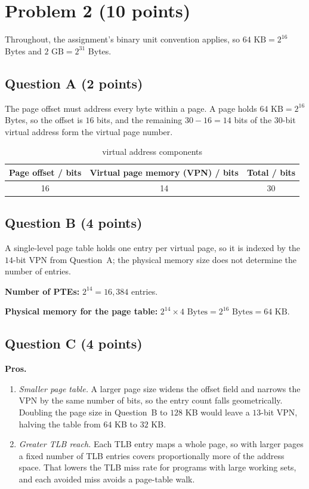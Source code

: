 \section*{Problem 2 (10 points)}

Throughout, the assignment's binary unit convention applies, so
$64\text{ KB} = 2^{16}$ Bytes and $2\text{ GB} = 2^{31}$ Bytes.

\subsection*{Question A (2 points)}

The page offset must address every byte within a page. A page holds
$64\text{ KB} = 2^{16}$ Bytes, so the offset is $16$ bits, and the remaining
$30 - 16 = 14$ bits of the $30$-bit virtual address form the virtual page number.

\begin{table}[H]
  \centering
  \caption{virtual address components}
  \label{p2:tab:vaddr}
  \begin{tabular}{ccc}
    \toprule
    Page offset / bits & Virtual page memory (VPN) / bits & Total / bits \\
    \midrule
    16 & 14 & 30 \\
    \bottomrule
  \end{tabular}
\end{table}

\subsection*{Question B (4 points)}

A single-level page table holds one entry per virtual page, so it is indexed by the
$14$-bit VPN from Question~A; the physical memory size does not determine the number
of entries.

\textbf{Number of PTEs:} $2^{14} = 16{,}384$ entries.

\textbf{Physical memory for the page table:}
$2^{14} \times 4\text{ Bytes} = 2^{16}\text{ Bytes} = 64\text{ KB}$.

\subsection*{Question C (4 points)}

\textbf{Pros.}
\begin{enumerate}
  \item \emph{Smaller page table.} A larger page size widens the offset field and
    narrows the VPN by the same number of bits, so the entry count falls
    geometrically. Doubling the page size in Question~B to $128$ KB would leave a
    $13$-bit VPN, halving the table from $64$ KB to $32$ KB.
  \item \emph{Greater TLB reach.} Each TLB entry maps a whole page, so with larger
    pages a fixed number of TLB entries covers proportionally more of the address
    space. That lowers the TLB miss rate for programs with large working sets, and
    each avoided miss avoids a page-table walk.
\end{enumerate}

